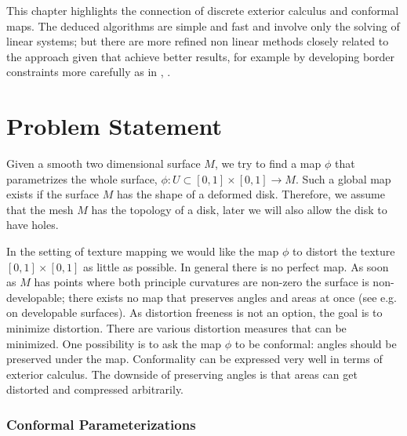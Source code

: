 This chapter highlights the connection of discrete exterior calculus and conformal maps. The deduced algorithms are simple and fast and involve only the solving of linear systems; but there are more refined non linear methods closely related to the approach given that achieve better results, for example by developing border constraints more carefully as in  \cite{meshpar1}, \cite{meshpar2}.


\section{Problem Statement}

	Given a smooth two dimensional surface $M$, we try to find a map $\phi$ that parametrizes the whole surface, $\phi: U \subset [0,1]\times [0,1] \rightarrow M$. Such a global map exists if the surface $M$ has the shape of a deformed disk. Therefore, we assume that the mesh $M$ has the topology of a disk, later we will also allow the disk to have holes. 
	
In the setting of texture mapping we would like the map $\phi$ to distort the texture $[0,1]\times [0,1]$ as little as possible. In general there is no perfect map. As soon as $M$ has points where both principle curvatures are non-zero the surface is non-developable; there exists no map that preserves angles and areas at once (see e.g. \cite{ carmo1992differentialgeometrie} on developable surfaces). As distortion freeness is not an option, the goal is to minimize distortion. There are various distortion measures that can be minimized. One possibility is to ask the map $\phi$ to be conformal: angles should be preserved under the map. 
Conformality can be expressed very well in terms of exterior calculus. The downside of preserving angles is that areas can get distorted and compressed arbitrarily.


\subsubsection{Conformal Parameterizations}


